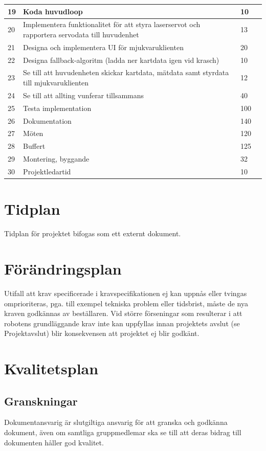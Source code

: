\documentclass{article}
\begin{document}
\begin{table}[H]
{\begin{tabular}{| l | l | l | l |}
 19 & Koda huvudloop & 10 \\ \hline
 20 & Implementera funktionalitet för att styra laserservot och rapportera servodata till huvudenhet & 13 \\ \hline
 21 & Designa och implementera UI för mjukvaruklienten & 20 \\ \hline
 22 & Designa fallback-algoritm (ladda ner kartdata igen vid krasch) & 10 \\
 23 & Se till att huvudenheten skickar kartdata, mätdata samt styrdata till mjukvaruklienten & 12 \\
 24 & Se till att allting vunferar tillsammans & 40 \\ \hline
 25 & Testa implementation & 100 \\ \hline
 26 & Dokumentation & 140 \\ \hline
 27 & Möten & 120 \\ \hline
 28 & Buffert & 125 \\ \hline
 29 & Montering, byggande & 32 \\ \hline
 30 & Projektledartid & 10 \\ \hline
 \end{tabular}}
\end{table}
\section{Tidplan}
Tidplan för projektet bifogas som ett externt dokument.

\section{Förändringsplan}
Utifall att krav specificerade i kravspecifikationen ej kan uppnås eller tvingas omprioriteras, pga. till exempel tekniska problem eller tidsbrist, måste de nya kraven godkännas av beställaren. Vid större förseningar som resulterar i att robotens grundläggande krav inte kan uppfyllas innan projektets avslut (se Projektavslut) blir konsekvensen att projektet ej blir godkänt.

\section{Kvalitetsplan}
\subsection{Granskningar}
Dokumentansvarig är slutgiltiga ansvarig för att granska och godkänna dokument, även om samtliga gruppmedlemar ska se till att deras bidrag till dokumenten håller god kvalitet.
\end{document}
